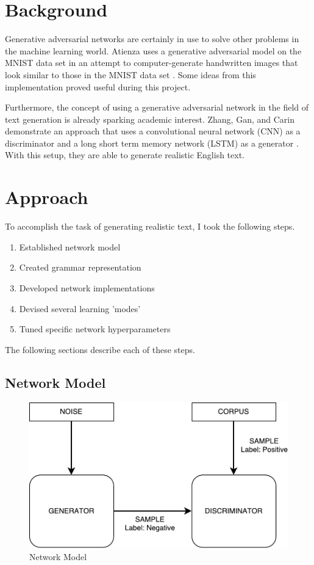 \documentclass[12pt]{article}
\begin{document}
\section{Background}

Generative adversarial networks are certainly in use to solve other problems in the machine learning world. Atienza uses a generative adversarial model on the MNIST data set in an attempt to computer-generate handwritten images that look similar to those in the MNIST data set \cite{gen_adv_example}. Some ideas from this implementation proved useful during this project.

Furthermore, the concept of using a generative adversarial network in the field of text generation is already sparking academic interest. Zhang, Gan, and Carin demonstrate an approach that uses a convolutional neural network (CNN) as a discriminator and a long short term memory network (LSTM) as a generator \cite{gan}. With this setup, they are able to generate realistic English text.

\section{Approach}

To accomplish the task of generating realistic text, I took the following steps.

\begin{enumerate}
    \item Established network model
    \item Created grammar representation
    \item Developed network implementations
    \item Devised several learning 'modes'
    \item Tuned specific network hyperparameters
\end{enumerate}

\noindent The following sections describe each of these steps.

\subsection{Network Model}

\begin{figure}[ht]
    \centering
    \includegraphics[scale=0.5]{img/network_model.pdf}
    \caption{Network Model}
    \label{fig:net_model}
\end{figure}
\end{document}
